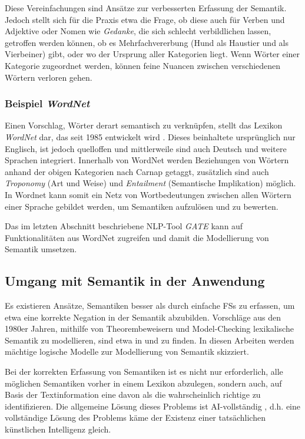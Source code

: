 \documentclass[12pt]{report}
\begin{document}
Diese Vereinfachungen sind Ansätze zur verbesserten Erfassung der Semantik.  Jedoch stellt sich für die Praxis etwa die Frage, ob diese auch für Verben und Adjektive oder Nomen wie \textit{\glqq  Gedanke\grqq{}}, die sich schlecht verbildlichen lassen, getroffen werden können, ob es \glqq  Mehrfachvererbung\grqq{} (Hund als Haustier und als Vierbeiner) gibt, oder wo der Ursprung aller Kategorien liegt. Wenn Wörter einer Kategorie zugeordnet werden, können feine Nuancen zwischen verschiedenen Wörtern verloren gehen. 


\subsubsection{Beispiel \textit{WordNet}}
Einen Vorschlag, Wörter derart semantisch zu verknüpfen, stellt das Lexikon \textit{WordNet} dar, das seit 1985 entwickelt wird \cite{mil95}. Dieses beinhaltete ursprünglich nur Englisch, ist jedoch quelloffen und mittlerweile sind auch Deutsch und weitere Sprachen integriert. Innerhalb von WordNet werden Beziehungen von Wörtern anhand der obigen Kategorien nach Carnap getaggt, zusätzlich sind auch \textit{Troponomy} (Art und Weise) und \textit{Entailment} (Semantische Implikation) möglich. In Wordnet kann somit ein Netz von Wortbedeutungen zwischen allen Wörtern einer Sprache gebildet werden, um Semantiken aufzulösen und zu bewerten. 

Das im letzten Abschnitt beschriebene NLP-Tool \textit{GATE} kann auf Funktionalitäten aus WordNet zugreifen und damit die Modellierung von Semantik umsetzen.

\subsection{Umgang mit Semantik in der Anwendung}
Es existieren Ansätze, Semantiken besser als durch einfache FSs zu erfassen, um etwa eine korrekte Negation in der Semantik abzubilden. Vorschläge aus den 1980er Jahren, mithilfe von Theorembeweisern und Model-Checking lexikalische Semantik zu modellieren, sind etwa in \cite{sb88} und \cite{kn85} zu finden. In diesen Arbeiten werden mächtige logische Modelle zur Modellierung von Semantik skizziert. 

Bei der korrekten Erfassung von Semantiken ist es nicht nur erforderlich, alle möglichen Semantiken vorher in einem Lexikon abzulegen, sondern auch, auf Basis der Textinformation eine davon als die wahrscheinlich richtige zu identifizieren. Die allgemeine Lösung dieses Problems ist AI-vollständig \cite{cop04}, d.h. eine vollständige Lösung des Problems käme der Existenz einer tatsächlichen künstlichen Intelligenz gleich. 
\end{document}
